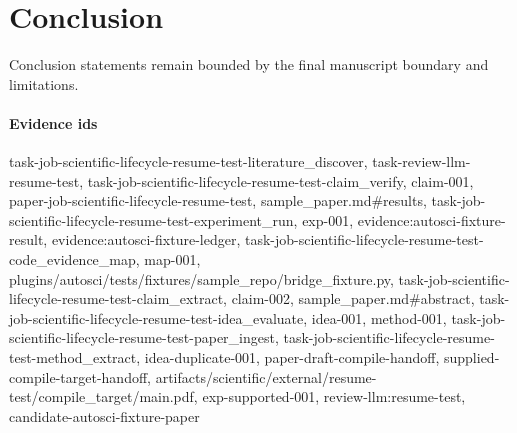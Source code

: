 \section{Conclusion}
Conclusion statements remain bounded by the final manuscript boundary and limitations.

\paragraph{Evidence ids} task-job-scientific-lifecycle-resume-test-literature\_discover, task-review-llm-resume-test, task-job-scientific-lifecycle-resume-test-claim\_verify, claim-001, paper-job-scientific-lifecycle-resume-test, sample\_paper.md\#results, task-job-scientific-lifecycle-resume-test-experiment\_run, exp-001, evidence:autosci-fixture-result, evidence:autosci-fixture-ledger, task-job-scientific-lifecycle-resume-test-code\_evidence\_map, map-001, plugins/autosci/tests/fixtures/sample\_repo/bridge\_fixture.py, task-job-scientific-lifecycle-resume-test-claim\_extract, claim-002, sample\_paper.md\#abstract, task-job-scientific-lifecycle-resume-test-idea\_evaluate, idea-001, method-001, task-job-scientific-lifecycle-resume-test-paper\_ingest, task-job-scientific-lifecycle-resume-test-method\_extract, idea-duplicate-001, paper-draft-compile-handoff, supplied-compile-target-handoff, artifacts/scientific/external/resume-test/compile\_target/main.pdf, exp-supported-001, review-llm:resume-test, candidate-autosci-fixture-paper

